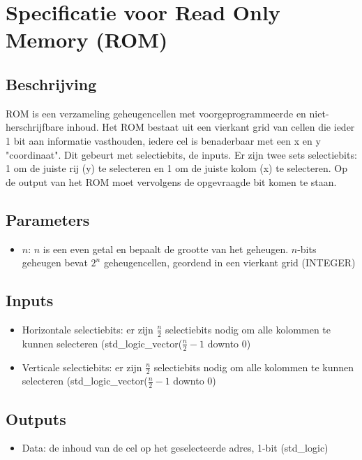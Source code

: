 \documentclass{article}
\begin{document}
\section{Specificatie voor Read Only Memory (ROM)}
\subsection{Beschrijving}
ROM is een verzameling geheugencellen met voorgeprogrammeerde en niet-herschrijfbare inhoud. Het ROM bestaat uit een vierkant grid van cellen die ieder 1 bit aan informatie vasthouden, iedere cel is benaderbaar met een x en y "coordinaat". Dit gebeurt met selectiebits, de inputs. Er zijn twee sets selectiebits: 1 om de juiste rij (y) te selecteren en 1 om de juiste kolom (x) te selecteren. Op de output van het ROM moet vervolgens de opgevraagde bit komen te staan.
\subsection{Parameters}
\begin{itemize}
	\item $n$: $n$ is een even getal en bepaalt de grootte van het geheugen. $n$-bits geheugen bevat $2^{n}$ geheugencellen, geordend in een vierkant grid (INTEGER)
\end{itemize}
\subsection{Inputs}
\begin{itemize}
	\item Horizontale selectiebits: er zijn $\frac{n}{2}$ selectiebits nodig om alle kolommen te kunnen selecteren (std_logic_vector($\frac{n}{2}-1$ downto 0)
	\item Verticale selectiebits: er zijn $\frac{n}{2}$ selectiebits nodig om alle kolommen te kunnen selecteren (std_logic_vector($\frac{n}{2}-1$ downto 0)
\end{itemize}
\subsection{Outputs}
\begin{itemize}
	\item Data: de inhoud van de cel op het geselecteerde adres, 1-bit (std_logic)
\end{itemize}
\end{document}

